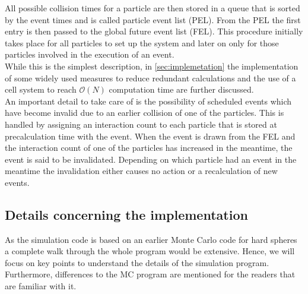 All possible collision times for a particle are then stored in a queue that is sorted by the event times and is called particle event list (PEL). From the PEL the first entry is then passed to the global future event list (FEL). This procedure initially takes place for all particles to set up the system and later on only for those particles involved in the execution of an event.\\

While this is the simplest description, in \autoref{sec:implemetation} the implementation of some widely used measures to reduce redundant calculations and the use of a cell system to reach $\mathcal{O}(N)$ computation time are further discussed.\\

An important detail to take care of is the possibility of scheduled events which have become invalid due to an earlier collision of one of the particles. This is handled by assigning an interaction count to each particle that is stored at precalculation time with the event. When the event is drawn from the FEL and the interaction count of one of the particles has increased in the meantime, the event is said to be invalidated. Depending on which particle had an event in the meantime the invalidation either causes no action or a recalculation of new events.

\subsection{Details concerning the implementation} 
\label{sec:implemetation}
As the simulation code is based on an earlier Monte Carlo code for hard spheres a complete walk through the whole program would be extensive. Hence, we will focus on key points to understand the details of the simulation program. Furthermore, differences to the MC program are mentioned for the readers that are familiar with it.

